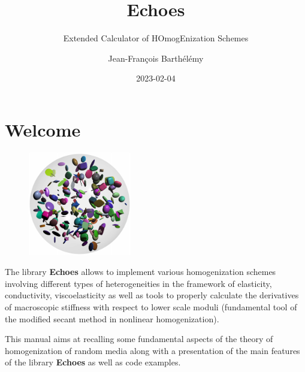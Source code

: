 \documentclass[
  letterpaper,
  DIV=11,
  numbers=noendperiod]{scrreprt}
\title{Echoes}
\subtitle{Extended Calculator of HOmogEnization Schemes}
\author{Jean-François Barthélémy}
\date{2023-02-04}
\renewcommand*\contentsname{Table of contents}
\newcommand\contentsname{Table of contents}
\begin{document}
\maketitle
\ifdefined\Shaded\renewenvironment{Shaded}{\begin{tcolorbox}[frame hidden, boxrule=0pt, breakable, enhanced, borderline west={3pt}{0pt}{shadecolor}, interior hidden, sharp corners]}{\end{tcolorbox}}\fi

\renewcommand*\contentsname{Table of contents}
{
\hypersetup{linkcolor=}
\setcounter{tocdepth}{2}
\tableofcontents
}

\hypertarget{sec-welcome}{%
\chapter*{Welcome}\label{sec-welcome}}


\begin{figure}

{\centering \includegraphics[width=0.4\textwidth,height=\textheight]{images/cover.pdf}

}

\end{figure}

The library \textbf{Echoes} allows to implement various homogenization
schemes involving different types of heterogeneities in the framework of
elasticity, conductivity, viscoelasticity as well as tools to properly
calculate the derivatives of macroscopic stiffness with respect to lower
scale moduli (fundamental tool of the modified secant method in
nonlinear homogenization).

This manual aims at recalling some fundamental aspects of the theory of
homogenization of random media along with a presentation of the main
features of the library \textbf{Echoes} as well as code examples.
\end{document}
